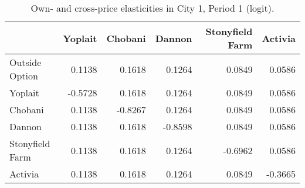 \begin{table}[H]
\centering
\caption{Own- and cross-price elasticities in City 1, Period 1 (logit).}
\label{tab:q4_elasticity_city1p1}
\begin{tabular}{lrrrrr}
\toprule
 & Yoplait & Chobani & Dannon & Stonyfield Farm & Activia \\
\midrule
Outside Option & 0.1138 & 0.1618 & 0.1264 & 0.0849 & 0.0586 \\
Yoplait & -0.5728 & 0.1618 & 0.1264 & 0.0849 & 0.0586 \\
Chobani & 0.1138 & -0.8267 & 0.1264 & 0.0849 & 0.0586 \\
Dannon & 0.1138 & 0.1618 & -0.8598 & 0.0849 & 0.0586 \\
Stonyfield Farm & 0.1138 & 0.1618 & 0.1264 & -0.6962 & 0.0586 \\
Activia & 0.1138 & 0.1618 & 0.1264 & 0.0849 & -0.3665 \\
\bottomrule
\end{tabular}
\end{table}
